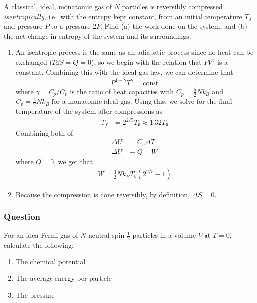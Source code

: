 A classical, ideal, monatomic gas of $N$ particles is reversibly compressed
\emph{isentropically}, i.e.~with the entropy kept constant, from an initial
temperature $T₀$ and pressure $P$ to a pressure $2P$. Find (a) the work done
on the system, and (b) the net change in entropy of the system and its
surroundings.

\begin{enumerate}
	\item
		An isentropic process is the same as an adiabatic process since no
		heat can be exchanged ($T\dd S = Q = 0$), so we begin with the relation
		that $PV^{γ}$ is a constant. Combining this with the ideal gas law,
		we can determine that
		\begin{align*}
			P^{1-γ}T^{γ} = \mathrm{const}
		\end{align*}
		where $γ = C_p/C_v$ is the ratio of heat capacities with $C_p =
		\frac 52 Nk_B$ and $C_v = \frac 32 Nk_B$ for a monatomic ideal gas.
		Using this, we solve for the final temperature of the system after
		compressions as
		\begin{align*}
			T_f &= 2^{2/5} T₀ ≈ 1.32T₀
		\end{align*}
		Combining both of
		\begin{align*}
			ΔU &= C_v ΔT \\
			ΔU &= Q + W
		\end{align*}
		where $Q = 0$, we get that
		\begin{align}
			\boxed{
			W = \frac 32 Nk_B T₀ (2^{2/5} - 1)
			}
		\end{align}
	\item
		Because the compression is done reversibly, by definition, $ΔS = 0$.
\end{enumerate}

\subsubsection{Question}

For an idea Fermi gas of $N$ neutral spin-$\frac 12$ particles in a volume
$V$ at $T = 0$, calculate the following:
\begin{enumerate}
	\item The chemical potential
	\item The average energy per particle
	\item The pressure
\end{enumerate}

